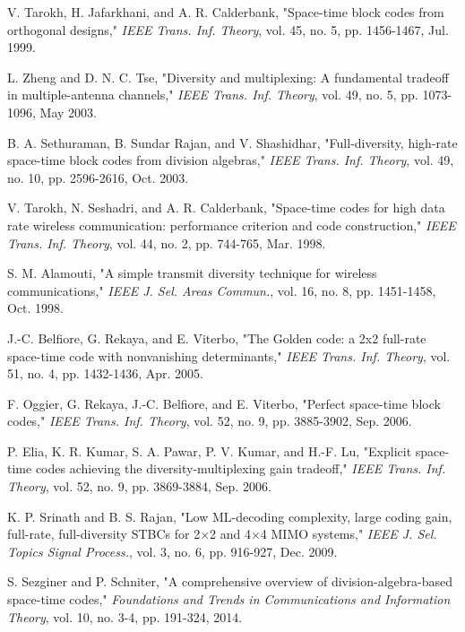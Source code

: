 
\begin{thebibliography}{14}
 V. Tarokh, H. Jafarkhani, and A. R. Calderbank, "Space-time block codes from orthogonal designs," \textit{IEEE Trans. Inf. Theory}, vol. 45, no. 5, pp. 1456-1467, Jul. 1999.

 L. Zheng and D. N. C. Tse, "Diversity and multiplexing: A fundamental tradeoff in multiple-antenna channels," \textit{IEEE Trans. Inf. Theory}, vol. 49, no. 5, pp. 1073-1096, May 2003.

 B. A. Sethuraman, B. Sundar Rajan, and V. Shashidhar, "Full-diversity, high-rate space-time block codes from division algebras," \textit{IEEE Trans. Inf. Theory}, vol. 49, no. 10, pp. 2596-2616, Oct. 2003.

 V. Tarokh, N. Seshadri, and A. R. Calderbank, "Space-time codes for high data rate wireless communication: performance criterion and code construction," \textit{IEEE Trans. Inf. Theory}, vol. 44, no. 2, pp. 744-765, Mar. 1998.

 S. M. Alamouti, "A simple transmit diversity technique for wireless communications," \textit{IEEE J. Sel. Areas Commun.}, vol. 16, no. 8, pp. 1451-1458, Oct. 1998.

 J.-C. Belfiore, G. Rekaya, and E. Viterbo, "The Golden code: a 2x2 full-rate space-time code with nonvanishing determinants," \textit{IEEE Trans. Inf. Theory}, vol. 51, no. 4, pp. 1432-1436, Apr. 2005.

 F. Oggier, G. Rekaya, J.-C. Belfiore, and E. Viterbo, "Perfect space-time block codes," \textit{IEEE Trans. Inf. Theory}, vol. 52, no. 9, pp. 3885-3902, Sep. 2006.

 P. Elia, K. R. Kumar, S. A. Pawar, P. V. Kumar, and H.-F. Lu, "Explicit space-time codes achieving the diversity-multiplexing gain tradeoff," \textit{IEEE Trans. Inf. Theory}, vol. 52, no. 9, pp. 3869-3884, Sep. 2006.

 K. P. Srinath and B. S. Rajan, "Low ML-decoding complexity, large coding gain, full-rate, full-diversity STBCs for 2×2 and 4×4 MIMO systems," \textit{IEEE J. Sel. Topics Signal Process.}, vol. 3, no. 6, pp. 916-927, Dec. 2009.

 S. Sezginer and P. Schniter, "A comprehensive overview of division-algebra-based space-time codes," \textit{Foundations and Trends in Communications and Information Theory}, vol. 10, no. 3-4, pp. 191-324, 2014.


\end{thebibliography}
